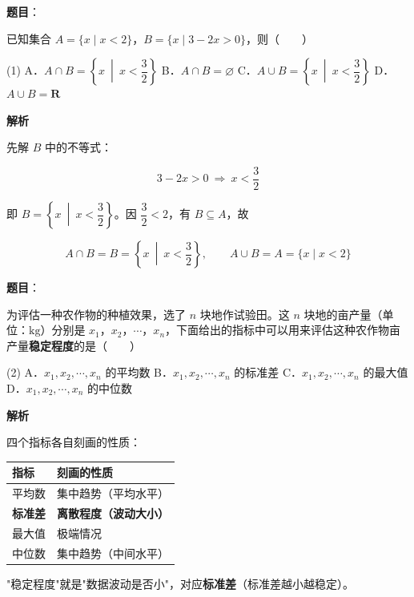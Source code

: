 \begin{answer}

\textbf{题目}：

已知集合 $A=\{x\mid x<2\}$，$B=\{x\mid3-2x>0\}$，则\mbox{（　　）}

\begin{gkopts}(1)
\task A．$A\cap B=\left\{x\ \middle|\ x<\dfrac32\right\}$
\task B．$A\cap B=\varnothing$
\task C．$A\cup B=\left\{x\ \middle|\ x<\dfrac32\right\}$
\task D．$A\cup B=\mathbf R$
\end{gkopts}

\textbf{解析}

先解 $B$ 中的不等式：

\nopagebreak[4]
\[3-2x>0\ \Longrightarrow\ x<\frac32\]

即 $B=\left\{x\ \middle|\ x<\dfrac32\right\}$。因 $\dfrac32<2$，有 $B\subseteq A$，故

\nopagebreak[4]
\[A\cap B=B=\left\{x\ \middle|\ x<\frac32\right\},\qquad A\cup B=A=\{x\mid x<2\}\]


\par\medskip

\end{answer}
\begin{answer}

\textbf{题目}：

为评估一种农作物的种植效果，选了 $n$ 块地作试验田。这 $n$ 块地的亩产量（单位：$\mathrm{kg}$）分别是 $x_1$，$x_2$，$\cdots$，$x_n$，下面给出的指标中可以用来评估这种农作物亩产量\textbf{稳定程度}的是\mbox{（　　）}

\begin{gkopts}(2)
\task A．$x_1,x_2,\cdots,x_n$ 的平均数
\task B．$x_1,x_2,\cdots,x_n$ 的标准差
\task C．$x_1,x_2,\cdots,x_n$ 的最大值
\task D．$x_1,x_2,\cdots,x_n$ 的中位数
\end{gkopts}

\textbf{解析}

四个指标各自刻画的性质：

\begin{center}
\begin{tabular}{ll}
\toprule
指标 & 刻画的性质 \\
\midrule
平均数 & 集中趋势（平均水平） \\
\textbf{标准差} & \textbf{离散程度（波动大小）} \\
最大值 & 极端情况 \\
中位数 & 集中趋势（中间水平） \\
\bottomrule
\end{tabular}
\end{center}

"稳定程度"就是"数据波动是否小"，对应\textbf{标准差}（标准差越小越稳定）。


\par\medskip

\end{answer}
